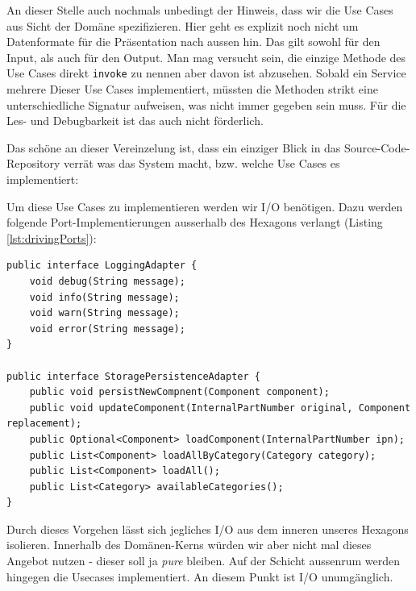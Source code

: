 An dieser Stelle auch nochmals unbedingt der Hinweis, dass wir die Use Cases
aus Sicht der Domäne spezifizieren. Hier geht es explizit noch nicht um
Datenformate für die Präsentation nach aussen hin. Das gilt sowohl für den
Input, als auch für den Output. Man mag versucht sein, die einzige Methode
des Use Cases direkt \texttt{invoke} zu nennen aber davon ist abzusehen.
Sobald ein Service mehrere Dieser Use Cases implementiert, müssten die
Methoden strikt eine unterschiedliche Signatur aufweisen, was nicht immer
gegeben sein muss. Für die Les- und Debugbarkeit ist das auch nicht förderlich.

Das schöne an dieser Vereinzelung ist, dass ein einziger Blick in das
Source-Code-Repository verrät was das System macht, bzw. welche Use Cases es
implementiert:
\\
%

Um diese Use Cases zu implementieren werden wir I/O benötigen. Dazu werden
folgende Port-Implementierungen ausserhalb des Hexagons verlangt 
(Listing \ref{lst:drivingPorts}):

\begin{listing}[H]
\begin{verbatim}
public interface LoggingAdapter {
    void debug(String message);
    void info(String message);
    void warn(String message);
    void error(String message);
}

public interface StoragePersistenceAdapter {
    public void persistNewCompnent(Component component);
    public void updateComponent(InternalPartNumber original, Component replacement);
    public Optional<Component> loadComponent(InternalPartNumber ipn);
    public List<Component> loadAllByCategory(Category category);
    public List<Component> loadAll();
    public List<Category> availableCategories();
}
\end{verbatim}
\caption{I\/O Ports zur Aussenwelt (\textit{Driving Ports})}
\label{lst:drivingPorts}
\end{listing}

Durch dieses Vorgehen lässt sich jegliches I/O aus dem inneren unseres Hexagons
isolieren. Innerhalb des Domänen-Kerns würden wir aber nicht mal dieses Angebot
nutzen - dieser soll ja \textit{pure} bleiben. Auf der Schicht aussenrum werden
hingegen die Usecases implementiert. An diesem Punkt ist I/O unumgänglich.


